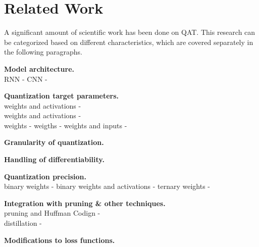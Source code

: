 \chapter{Related Work\label{cha:chapter5}}

A significant amount of scientific work has been done on QAT. 
This research can be categorized based on different characteristics, 
which are covered separately in the following paragraphs.

\noindent
\textbf{Model architecture.}\\
RNN - \cite{ott2016rnn}
CNN - \cite{rastegari2016xnor}

\noindent
\textbf{Quantization target parameters.}\\
weights and activations - \cite{krishnamoorthi2018quantizing}\\
weights and activations - \cite{hubara2016qnn}\\
weights - \cite{polino2018modelcompression}
weigths - \cite{ott2016rnn}
weights and inputs - \cite{rastegari2016xnor}


\noindent
\textbf{Granularity of quantization.}

\noindent
\textbf{Handling of differentiability.}

\noindent
\textbf{Quantization precision.}\\
binary weights - \cite{courbariaux2015binaryconnect}
binary weights and activations - \cite{hubara2016qnn}
ternary weights - \cite{ott2016rnn}

\noindent
\textbf{Integration with pruning \& other techniques.}\\
pruning and Huffman Codign - \cite{han2016deepcompression}\\
distillation - \cite{polino2018modelcompression}

\noindent
\textbf{Modifications to loss functions.}
